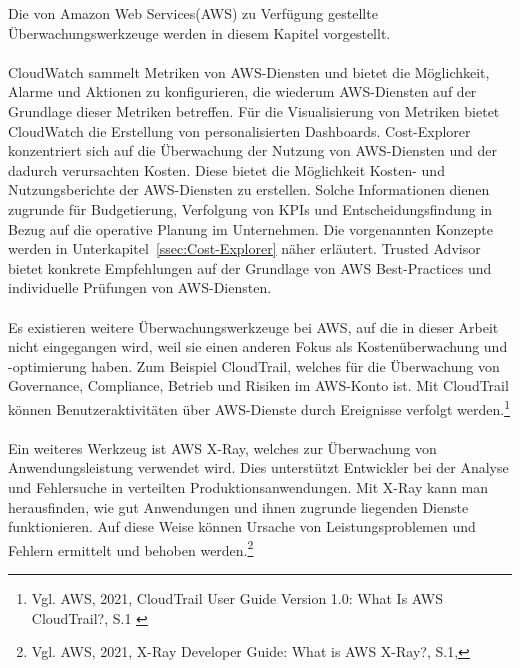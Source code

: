 Die von Amazon Web Services(AWS) zu Verfügung gestellte Überwachungswerkzeuge werden in diesem Kapitel vorgestellt. %
\\\\
CloudWatch sammelt Metriken von AWS-Diensten und bietet die Möglichkeit, Alarme und Aktionen zu konfigurieren, die wiederum AWS-Diensten auf der Grundlage dieser Metriken betreffen. Für die Visualisierung von Metriken bietet CloudWatch die Erstellung von personalisierten Dashboards.
Cost-Explorer konzentriert sich auf die Überwachung der Nutzung von AWS-Diensten und der dadurch verursachten Kosten. Diese bietet die Möglichkeit Kosten- und Nutzungsberichte der AWS-Diensten zu erstellen. Solche Informationen dienen zugrunde für Budgetierung, %
Verfolgung von KPIs und Entscheidungsfindung in Bezug auf die operative Planung im Unternehmen. Die vorgenannten Konzepte werden in Unterkapitel~\ref{ssec:Cost-Explorer} näher erläutert. %
Trusted Advisor bietet konkrete Empfehlungen auf der Grundlage von AWS Best-Practices und individuelle Prüfungen von AWS-Diensten.
\\\\
Es existieren weitere Überwachungswerkzeuge bei AWS, auf die in dieser Arbeit nicht eingegangen wird, weil sie einen anderen Fokus als Kostenüberwachung und -optimierung haben. Zum Beispiel CloudTrail, welches für die Überwachung von Governance, Compliance, Betrieb und Risiken im AWS-Konto ist. Mit CloudTrail können Benutzeraktivitäten über AWS-Dienste durch Ereignisse verfolgt werden.\footnote{Vgl. AWS, 2021, CloudTrail User Guide Version 1.0: What Is AWS CloudTrail?, S.1 \cite{AMZ27}}
\\\\
Ein weiteres Werkzeug ist AWS X-Ray, welches zur Überwachung von Anwendungsleistung verwendet wird. Dies unterstützt Entwickler bei der Analyse und Fehlersuche in verteilten Produktionsanwendungen. Mit X-Ray kann man herausfinden, wie gut Anwendungen und ihnen zugrunde liegenden Dienste funktionieren. Auf diese Weise können Ursache von Leistungsproblemen und Fehlern ermittelt und behoben werden.\footnote{Vgl. AWS, 2021, X-Ray Developer Guide: What is AWS X-Ray?, S.1\cite{AMZ27},}
